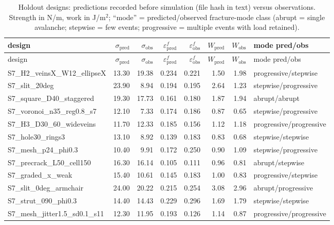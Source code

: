 \begingroup\footnotesize\setlength{\tabcolsep}{4pt}
\begin{longtable}{>{\raggedright\arraybackslash}p{3.6cm}rrrrrrp{3.2cm}}
\caption{Holdout designs: predictions recorded before simulation (file hash in text) versus observations. Strength in N/m, work in J/m$^2$; ``mode'' = predicted/observed fracture-mode class (abrupt = single avalanche; stepwise = few events; progressive = multiple events with load retained).}\label{tab:holdout}\\
\toprule design & $\sigma_\mathrm{pred}$ & $\sigma_\mathrm{obs}$ & $\varepsilon^f_\mathrm{pred}$ & $\varepsilon^f_\mathrm{obs}$ & $W_\mathrm{pred}$ & $W_\mathrm{obs}$ & mode pred/obs\\ \midrule\endfirsthead
\toprule design & $\sigma_\mathrm{pred}$ & $\sigma_\mathrm{obs}$ & $\varepsilon^f_\mathrm{pred}$ & $\varepsilon^f_\mathrm{obs}$ & $W_\mathrm{pred}$ & $W_\mathrm{obs}$ & mode pred/obs\\ \midrule\endhead
S7\_\allowbreak{}H2\_\allowbreak{}veinsX\_\allowbreak{}W12\_\allowbreak{}ellipseX & 13.30 & 19.38 & 0.234 & 0.221 & 1.50 & 1.98 & progressive/stepwise\\
S7\_\allowbreak{}slit\_\allowbreak{}20deg & 23.90 & 8.94 & 0.194 & 0.195 & 2.64 & 1.23 & stepwise/progressive\\
S7\_\allowbreak{}square\_\allowbreak{}D40\_\allowbreak{}staggered & 19.30 & 17.73 & 0.161 & 0.180 & 1.87 & 1.94 & abrupt/abrupt\\
S7\_\allowbreak{}voronoi\_\allowbreak{}n35\_\allowbreak{}reg0.8\_\allowbreak{}s7 & 12.10 & 7.33 & 0.174 & 0.186 & 0.87 & 0.65 & stepwise/progressive\\
S7\_\allowbreak{}H3\_\allowbreak{}D30\_\allowbreak{}60\_\allowbreak{}wideveins & 11.70 & 12.33 & 0.185 & 0.156 & 1.12 & 1.18 & progressive/progressive\\
S7\_\allowbreak{}hole30\_\allowbreak{}rings3 & 13.10 & 8.92 & 0.139 & 0.183 & 0.83 & 0.68 & stepwise/stepwise\\
S7\_\allowbreak{}mesh\_\allowbreak{}p24\_\allowbreak{}phi0.3 & 10.40 & 9.91 & 0.172 & 0.250 & 0.90 & 1.09 & stepwise/progressive\\
S7\_\allowbreak{}precrack\_\allowbreak{}L50\_\allowbreak{}cell150 & 16.30 & 16.14 & 0.105 & 0.111 & 0.96 & 0.81 & abrupt/stepwise\\
S7\_\allowbreak{}graded\_\allowbreak{}x\_\allowbreak{}weak & 15.40 & 10.61 & 0.145 & 0.183 & 1.00 & 0.83 & progressive/stepwise\\
S7\_\allowbreak{}slit\_\allowbreak{}0deg\_\allowbreak{}armchair & 24.00 & 20.22 & 0.215 & 0.254 & 3.08 & 2.96 & abrupt/progressive\\
S7\_\allowbreak{}strut\_\allowbreak{}090\_\allowbreak{}phi0.3 & 14.40 & 14.43 & 0.229 & 0.296 & 1.69 & 1.79 & stepwise/stepwise\\
S7\_\allowbreak{}mesh\_\allowbreak{}jitter1.5\_\allowbreak{}sd0.1\_\allowbreak{}s11 & 12.30 & 11.95 & 0.193 & 0.126 & 1.14 & 0.87 & progressive/progressive\\
\bottomrule\end{longtable}\endgroup
